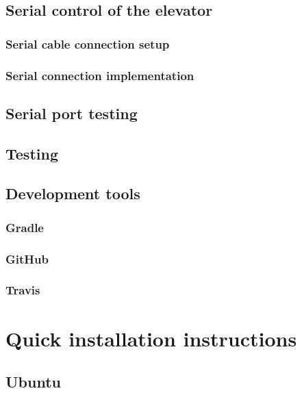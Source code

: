 \documentclass[a4paper, 12pt]{article}
\begin{document}
\subsection{Serial control of the elevator}

\subsubsection{Serial cable connection setup}

\subsubsection{Serial connection implementation}

\subsection{Serial port testing}

\subsection{Testing}

\subsection{Development tools}

\subsubsection{Gradle}

\subsubsection{GitHub}

\subsubsection{Travis}


\section{Quick installation instructions}
\subsection{Ubuntu}




\end{document}
